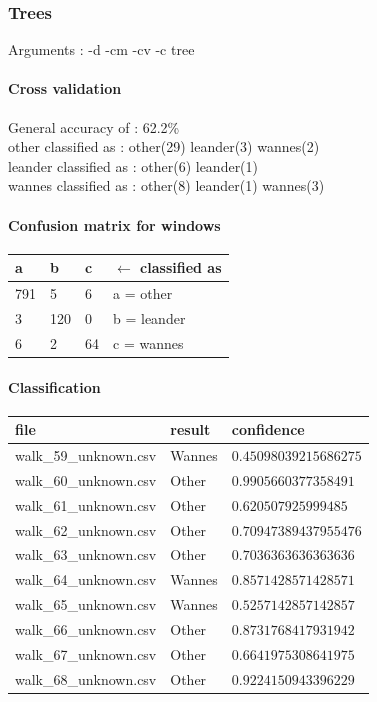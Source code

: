 \subsubsection{Trees}
Arguments : -d -cm -cv -c tree
\paragraph{Cross validation}
General accuracy of : 62.2\%\\

other classified as : other(29) leander(3) wannes(2) \\
leander classified as : other(6) leander(1) \\
wannes classified as : other(8) leander(1) wannes(3) 

\paragraph{Confusion matrix for windows}

\begin{tabular}{l l l | l}
    a &    b &   c & $\leftarrow$ classified as \\
    \hline
   791 & 5 & 6 &    a = other \\
    3 &  120 &  0 &    b = leander \\
    6 &   2 &  64 &    c = wannes
\end{tabular}

\paragraph{Classification}
\begin{tabular}{l | l | l}
    file & result & confidence\\ 
    \hline 
    walk\_59\_unknown.csv & Wannes   & $0.45098039215686275$ \\
    walk\_60\_unknown.csv & Other   & $0.9905660377358491$ \\
    walk\_61\_unknown.csv & Other   & $0.620507925999485$ \\
    walk\_62\_unknown.csv & Other   & $0.70947389437955476$ \\
    walk\_63\_unknown.csv & Other   & $0.7036363636363636$ \\
    walk\_64\_unknown.csv & Wannes   & $0.8571428571428571$ \\
    walk\_65\_unknown.csv & Wannes  & $0.5257142857142857$ \\
    walk\_66\_unknown.csv & Other   & $0.8731768417931942$ \\
    walk\_67\_unknown.csv & Other  & $0.6641975308641975$ \\
    walk\_68\_unknown.csv & Other   & $0.9224150943396229$
\end{tabular}

